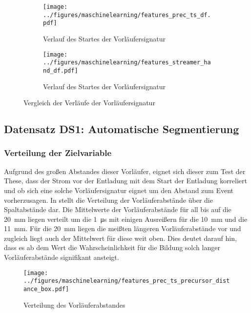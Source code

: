\begin{figure}[H]
    \centering
    \begin{subfigure}{0.48\linewidth}
        \centering
        \texttt{[image: ../figures/maschinelearning/features\_prec\_ts\_df.pdf]}
        \caption{Verlauf des Startes der Vorläufersignatur}
        \label{fig:precursor_current_sliece}
    \end{subfigure}
    \hfill
    \begin{subfigure}{0.48\linewidth}
        \centering
        \texttt{[image: ../figures/maschinelearning/features\_streamer\_hand\_df.pdf]}
        \caption{Verlauf des Startes der Vorläufersignatur}
        \label{fig:streamer_current_sliece}
    \end{subfigure}
    \caption{Vergleich der Verläufe der Vorläufersignatur}
    \label{fig:comparison_precursor_streamer}
\end{figure}

\subsection{Datensatz DS1: Automatische Segmentierung}

\subsubsection{Verteilung der Zielvariable}
Aufgrund des großen Abstandes dieser Vorläufer, eignet sich dieser zum Test der These, dass der Strom vor der Entladung mit dem Start der Entladung korreliert und ob sich eine solche Vorläufersignatur eignet um den Abstand zum Event vorherzusagen. In  stellt die Verteilung der Vorläuferabstände über die Spaltabstände dar. Die Mittelwerte der Vorläuferabstände für all bis auf die \SI{20}{\milli\meter} liegen verteilt um die \SI{1}{\micro\second} mit einigen Ausreißern für die \SI{10}{\milli\meter} und die \SI{11}{\milli\meter}. Für die \SI{20}{\milli\meter} liegen die meißten längeren Vorläuferabstände vor und zugleich liegt auch der Mittelwert für diese weit oben. Dies deutet darauf hin, dass es ab dem Wert die Wahrscheinlichkeit für die Bildung solch langer Vorläuferabstände signifikant ansteigt.


\begin{figure}[H]
    \centering
      \texttt{[image: ../figures/maschinelearning/features\_prec\_ts\_precursor\_distance\_box.pdf]}
      \caption{Verteilung des Vorläuferabstandes}
      \label{fig:prec_ts_prec_distance_box}
\end{figure}

